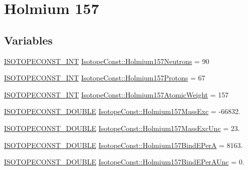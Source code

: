 \hypertarget{group___isotope_const-_holmium-_ho157}{}\section{Holmium 157}
\label{group___isotope_const-_holmium-_ho157}
\subsection*{Variables}
\begin{DoxyCompactItemize}
\item 
\mbox{\hyperlink{group___isotope_const-_macros_ga5f18360b3e99483a35c32d789e62621c}{I\+S\+O\+T\+O\+P\+E\+C\+O\+N\+S\+T\+\_\+\+I\+NT}} \mbox{\hyperlink{group___isotope_const-_holmium-_ho157_gafd40e0562cf648c93ae311b2a4fc59ca}{Isotope\+Const\+::\+Holmium157\+Neutrons}} = 90
\item 
\mbox{\hyperlink{group___isotope_const-_macros_ga5f18360b3e99483a35c32d789e62621c}{I\+S\+O\+T\+O\+P\+E\+C\+O\+N\+S\+T\+\_\+\+I\+NT}} \mbox{\hyperlink{group___isotope_const-_holmium-_ho157_ga62f8edbb44ea0c5c0a6bf9ff3984979f}{Isotope\+Const\+::\+Holmium157\+Protons}} = 67
\item 
\mbox{\hyperlink{group___isotope_const-_macros_ga5f18360b3e99483a35c32d789e62621c}{I\+S\+O\+T\+O\+P\+E\+C\+O\+N\+S\+T\+\_\+\+I\+NT}} \mbox{\hyperlink{group___isotope_const-_holmium-_ho157_gab209120ed0c27b18830f3b794ad258f4}{Isotope\+Const\+::\+Holmium157\+Atomic\+Weight}} = 157
\item 
\mbox{\hyperlink{group___isotope_const-_macros_ga8f45a7272ce02c0b4c65c44636ed719a}{I\+S\+O\+T\+O\+P\+E\+C\+O\+N\+S\+T\+\_\+\+D\+O\+U\+B\+LE}} \mbox{\hyperlink{group___isotope_const-_holmium-_ho157_gacd310cf41d1b70feaead765f28912fca}{Isotope\+Const\+::\+Holmium157\+Mass\+Exc}} = -\/66832.
\item 
\mbox{\hyperlink{group___isotope_const-_macros_ga8f45a7272ce02c0b4c65c44636ed719a}{I\+S\+O\+T\+O\+P\+E\+C\+O\+N\+S\+T\+\_\+\+D\+O\+U\+B\+LE}} \mbox{\hyperlink{group___isotope_const-_holmium-_ho157_ga99273eca7809066c46dffd86ed267844}{Isotope\+Const\+::\+Holmium157\+Mass\+Exc\+Unc}} = 23.
\item 
\mbox{\hyperlink{group___isotope_const-_macros_ga8f45a7272ce02c0b4c65c44636ed719a}{I\+S\+O\+T\+O\+P\+E\+C\+O\+N\+S\+T\+\_\+\+D\+O\+U\+B\+LE}} \mbox{\hyperlink{group___isotope_const-_holmium-_ho157_ga115891ef254f377e96527e4f6eb544cd}{Isotope\+Const\+::\+Holmium157\+Bind\+E\+PerA}} = 8163.
\item 
\mbox{\hyperlink{group___isotope_const-_macros_ga8f45a7272ce02c0b4c65c44636ed719a}{I\+S\+O\+T\+O\+P\+E\+C\+O\+N\+S\+T\+\_\+\+D\+O\+U\+B\+LE}} \mbox{\hyperlink{group___isotope_const-_holmium-_ho157_gaa7fa0aa209ff776012d6f782441627be}{Isotope\+Const\+::\+Holmium157\+Bind\+E\+Per\+A\+Unc}} = 0.

\end{DoxyCompactItemize}
